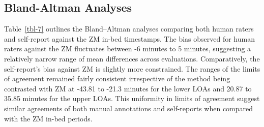 \documentclass[
  10pt,
]{scrbook}
\begin{document}
\endgroup

\hypertarget{bland-altman-analyses}{%
\subsection{Bland-Altman Analyses}\label{bland-altman-analyses}}

Table~\ref{tbl-7} outlines the Bland--Altman analyses comparing both
human raters and self-report against the ZM in-bed timestamps. The bias
observed for human raters against the ZM fluctuates between -6 minutes
to 5 minutes, suggesting a relatively narrow range of mean differences
across evaluations. Comparatively, the self-report's bias against ZM is
slightly more constrained. The ranges of the limits of agreement
remained fairly consistent irrespective of the method being contrasted
with ZM at -43.81 to -21.3 minutes for the lower LOAs and 20.87 to 35.85
minutes for the upper LOAs. This uniformity in limits of agreement
suggest similar agreements of both manual annotations and self-reports
when compared with the ZM in-bed periods.

\begingroup

\footnotesize
\end{document}
